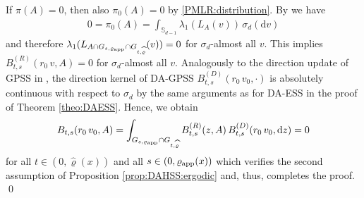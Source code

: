 \documentclass[sn-mathphys-num]{sn-jnl}%
\theoremstyle{thmstyleone}%
\theoremstyle{thmstyletwo}%
\theoremstyle{thmstylethree}%
\newcommand{\rhoapp}{\varrho_{{\rm app}}}
\newcommand{\change}[1]{\bgroup\color{black}#1\egroup}    %
\begin{document}
\begin{appendices}
\change{
If $\pi(A)=0$, then also $\pi_0(A)=0$ by \eqref{PMLR:distribution}. By \cite[Theorem~15.13]{Schilling2005} we have
\begin{align*}
    0 = \pi_0(A) = \int_{\mathbb{S}_{d-1}} \lambda_1(L_A(v)) \, \sigma_d(\mathrm{d}v)
\end{align*}
and therefore $\lambda_1(L_{A\cap G_{s,\varrho_{\textmd{app}}}\cap G_{t,\widehat{\varrho}}}(v))=0$ for $\sigma_d$-almost all $v$. This implies $B^{(R)}_{t,s}(r_0\, v, A)=0$ for $\sigma_d$-almost all $v$. 
Analogously to the direction update of GPSS in \cite[Theorem~4.11]{Schaer2025}, the direction kernel of DA-GPSS $B^{(D)}_{t,s}(r_0\, v_0,\cdot)$ is absolutely continuous with respect to $\sigma_d$ by the same arguments as for DA-ESS in the proof of Theorem \ref{theo:DAESS}. 
Hence, we obtain 
\begin{align*}
    B_{t,s}(r_0\, v_0, A)= \int_{ G_{s, \varrho_{\textmd{app}}}\cap G_{t, \widehat{\varrho}}} B^{(R)}_{t,s}(z, A) \, B^{(D)}_{t,s}(r_0\, v_0, \mathrm{d}z)=0
\end{align*}
for all $t\in(0,\widehat{\varrho}(x))$ and all $s\in(0, \rhoapp(x))$ which verifies the second assumption of Proposition \ref{prop:DAHSS:ergodic} and, thus, completes the proof. \hfill \qed
}


    
\end{appendices}


\end{document}
